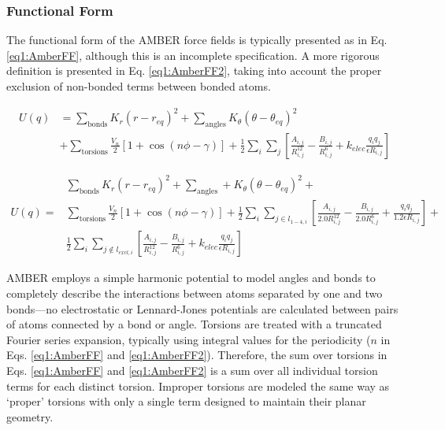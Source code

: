 \subsubsection{Functional Form}

The functional form of the AMBER force fields is typically presented as in Eq.
\ref{eq1:AmberFF}, \cite{Cornell_JAmChemSoc_1995_v117_p5179} although this is an
incomplete specification. A more rigorous definition is presented in Eq.
\ref{eq1:AmberFF2}, taking into account the proper exclusion of non-bonded terms
between bonded atoms.

\begin{align}
   U(q) & = \sum _ {\text{bonds}} K_r ( r - r_{eq}) ^ 2 + \sum _ {\text{angles}}
          K_{\theta} ( \theta - \theta _ {eq} ) ^ 2 \nonumber \\
      & + \sum _ {\text{torsions}} \frac {V_n} 2 \left [ 1 + \cos (n \phi -
          \gamma) \right ] + \frac 1 2 \sum _ {i} \sum _ {j} \left [ \frac
          {A_{i,j}} {R_{i,j} ^ {12}} - \frac {B_{i,j}} {R_{i,j} ^ 6} + k_{elec}
          \frac {q_i q_j} {\epsilon R_{i, j}} \right ]
   \label{eq1:AmberFF}
\end{align}

\begin{align}
    & \sum _ {\text{bonds}} K_r ( r - r_{eq}) ^ 2 + \sum _ {\text{angles}} +
          K_{\theta} ( \theta - \theta _ {eq} ) ^ 2 \nonumber + \\
   U(q) = & \sum _ {\text{torsions}} \frac {V_n} 2 \left [ 1 + \cos (n \phi -
      \gamma) \right ] + \frac 1 2 \sum _ {i} \sum _ {j \in l_{1-4,i}} \left [
      \frac {A_{i,j}} {2.0 R_{i,j} ^ {12}} - \frac {B_{i,j}} {2.0 R_{i,j} ^ 6} +
      \frac {q_i q_j} {1.2 \epsilon R _{i,j}} \right ] +
      \label{eq1:AmberFF2} \\
    & \frac 1 2 \sum _ {i} \sum _ {j \notin l_{excl,i}} \left [ \frac {A_{i,j}}
      {R_{i,j} ^ {12}} - \frac {B_{i,j}} {R_{i,j} ^ 6} + k_{elec} \frac {q_i
      q_j} {\epsilon R_{i, j}} \right ] \nonumber
\end{align}

AMBER employs a simple harmonic potential to model angles and bonds to
completely describe the interactions between atoms separated by one and two
bonds---\ie no electrostatic or Lennard-Jones potentials are calculated between
pairs of atoms connected by a bond or angle. Torsions are treated with a
truncated Fourier series expansion, typically using integral values for the
periodicity ($n$ in Eqs. \ref{eq1:AmberFF} and \ref{eq1:AmberFF2}). Therefore,
the sum over torsions in Eqs. \ref{eq1:AmberFF} and \ref{eq1:AmberFF2} is a sum
over all individual torsion terms for each distinct torsion. Improper torsions
are modeled the same way as `proper' torsions with only a single term designed
to maintain their planar geometry.

